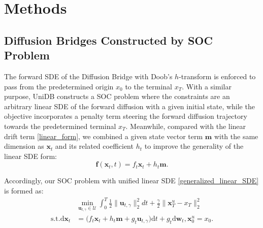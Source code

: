 \section{Methods}
\subsection{Diffusion Bridges Constructed by SOC Problem}
The forward SDE of the Diffusion Bridge with Doob’s $h$-transform is enforced to pass from the predetermined origin $x_0$ to the terminal $x_T$. With a similar purpose, UniDB constructs a SOC problem where the constraints are an arbitrary linear SDE of the forward diffusion with a given initial state, while the objective incorporates a penalty term steering the forward diffusion trajectory towards the predetermined terminal $x_T$. Meanwhile, compared with the linear drift term \eqref{linear_form}, we combined a given state vector term $\mathbf{m}$ with the same dimension as $\mathbf{x}_t$ and its related coefficient $h_t$ to improve the generality of the linear SDE form: 
\begin{equation}\label{generalized_linear_SDE}
\mathbf{f}(\mathbf{x}_t, t) = f_t \mathbf{x}_t + h_t \mathbf{m}.
\end{equation}

Accordingly, our SOC problem with unified linear SDE \eqref{generalized_linear_SDE} is formed as: 
\begin{equation}\label{SOC_problem_generalized_sde}
\begin{aligned}
&\min_{\mathbf{u}_{t, \gamma}\in \mathcal{U} } \int_{0}^{T} \frac{1}{2} \|\mathbf{u}_{t, \gamma}\|_2^2 dt + \frac{\gamma}{2} \| \mathbf{x}_T^{u} - x_T\|_2^2 \\
\text{s.t.} \mathrm{d} \mathbf{x}_t &= \Big( f_t \mathbf{x}_t + h_t \mathbf{m} + g_t \mathbf{u}_{t, \gamma} \Big) \mathrm{d} t + g_t \mathrm{d} \mathbf{w}_t, \mathbf{x}_0^u = x_0.
\end{aligned}
\end{equation}

